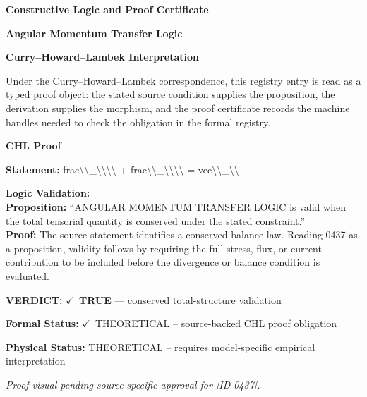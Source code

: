\clearpage
\begingroup\tzpsupportsetup
\noindent\textbf{\fontsize{10.8pt}{12.8pt}\selectfont [ID 0437] Constructive Logic and Proof Certificate}\par
\noindent\textbf{\fontsize{10pt}{12pt}\selectfont Angular Momentum Transfer Logic}\par
\vspace{0.45em}
\begingroup
\footnotesize
\setlength{\parskip}{0.22em}
\setlength{\parindent}{0pt}
\noindent\textbf{Curry--Howard--Lambek Interpretation}\par
Under the Curry--Howard--Lambek correspondence, this registry entry is read as a typed proof
object: the stated source condition supplies the proposition, the derivation supplies the
morphism, and the proof certificate records the machine handles needed to check the obligation
in the formal registry.

\vspace{0.45em}
\noindent\textbf{CHL Proof}\par
\textbf{Statement:} frac\textbackslash{}\textbackslash{}\_\textbackslash{}\textbackslash{}\textbackslash{}\textbackslash{} + frac\textbackslash{}\textbackslash{}\_\textbackslash{}\textbackslash{}\textbackslash{}\textbackslash{} = vec\textbackslash{}\textbackslash{}\_\textbackslash{}\textbackslash{}

\textbf{Logic Validation:}\\
\textbf{Proposition:} ``ANGULAR MOMENTUM TRANSFER LOGIC is valid when the total tensorial quantity is conserved
under the stated constraint.''\\
\textbf{Proof:} The source statement identifies a conserved balance law. Reading 0437 as a proposition,
validity follows by requiring the full stress, flux, or current contribution to be
included before the divergence or balance condition is evaluated.

\textbf{VERDICT:} \ensuremath{\checkmark}\ \textbf{TRUE} --- conserved total-structure validation

\textbf{Formal Status:} \ensuremath{\checkmark}\ THEORETICAL -- source-backed CHL proof obligation

\textbf{Physical Status:} THEORETICAL -- requires model-specific empirical interpretation
\par\vspace{0.45em}
\par
\vfill
\begingroup\footnotesize\itshape
Proof visual pending source-specific approval for [ID 0437].
\par\endgroup
\vfill
\endgroup
\endgroup
